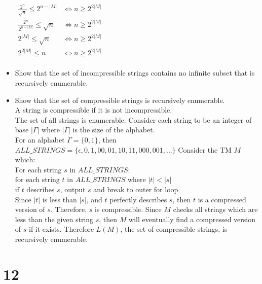 \documentclass[letterpaper,notitlepage,twoside]{article}
\renewcommand{\iff}{\Leftrightarrow} %
\newcommand\tab[1][1cm]{\hspace*{#1}} %
\begin{document}
\begin{itemize}
$\begin{aligned}
\frac{2^n}{\sqrt{n}} \leq 2^{n - |M|} &\iff n \geq 2^{2|M|} \\
\frac{2^n}{2^{n - |M|}} \leq \sqrt{n} &\iff n \geq 2^{2|M|} \\
2^{|M|} \leq \sqrt{n} &\iff n \geq 2^{2|M|} \\
2^{2|M|} \leq n &\iff n \geq 2^{2|M|} \\
\end{aligned}$

\item Show that the set of incompressible strings contains no infinite subset that is recursively enumerable.

\item Show that the set of compressible strings is recursively enumerable.\\
A string is compressible if it is not incompressible.\\
The set of all strings is enumerable. Consider each string to be an integer of base $|\Gamma|$ where $|\Gamma|$ is the size of the alphabet. \\
For an alphabet $\Gamma = \{0, 1\}$, then $ALL\_STRINGS = \{\epsilon, 0, 1, 00, 01, 10, 11, 000, 001,...\}$
Consider the TM $M$ which: \\
For each string $s$ in $ALL\_STRINGS$: \\
	\tab for each string $t$ in $ALL\_STRINGS$ where $|t| < |s|$ \\
		\tab\tab if $t$ describes $s$, output $s$ and break to outer for loop \\		
Since $|t|$ is less than $|s|$, and $t$ perfectly describes $s$, then $t$ is a compressed version of $s$. Therefore, $s$ is compressible. Since $M$ checks all strings which are less than the given string $s$, then $M$ will eventually find a compressed version of $s$ if it exists. Therefore $L(M)$, the set of compressible strings, is recursively enumerable.


\end{itemize}
\section*{12}
\end{document}
